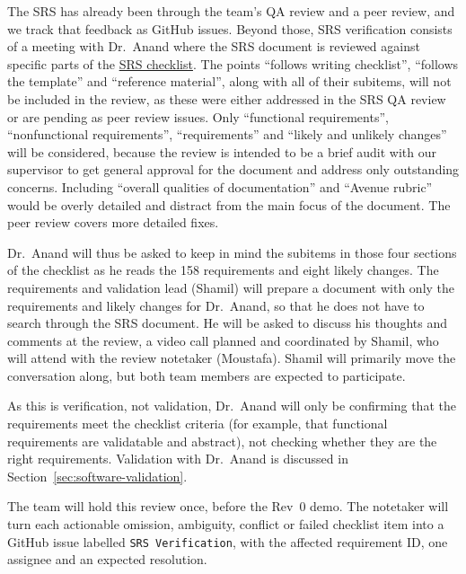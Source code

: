 \documentclass[12pt, titlepage]{article}
\begin{document}
The SRS has already been through the team's QA review and a peer review, and we
track that feedback as GitHub issues. Beyond those, SRS verification consists of
a meeting with Dr.\ Anand where the SRS document is reviewed against specific parts of the
\href{https://github.com/AHMEDELZARIA/squigglr/blob/main/docs/Checklists/SRS-Checklist.tex}{SRS
checklist}. The points ``follows writing checklist'', ``follows the template''
and ``reference material'', along with all of their subitems, will not be
included in the review, as these were either addressed in the SRS QA review or
are pending as peer review issues. Only ``functional requirements'',
``nonfunctional requirements'', ``requirements'' and ``likely and unlikely
changes'' will be considered, because the review is intended to be a brief audit
with our supervisor to get general approval for the document and address only
outstanding concerns. Including ``overall qualities of documentation'' and
``Avenue rubric'' would be overly detailed and distract from the main focus of
the document. The peer review covers more detailed fixes.

Dr.\ Anand will thus be asked to keep in mind the subitems in those four
sections of the checklist as he reads the 158 requirements and eight likely
changes. The requirements and validation lead (Shamil) will prepare a document
with only the requirements and likely changes for Dr.\ Anand, so that he does
not have to search through the SRS document. He will be asked to discuss his
thoughts and comments at the review, a video call planned and coordinated by
Shamil, who will attend with the review notetaker (Moustafa). Shamil will
primarily move the conversation along, but both team members are expected to
participate.

As this is verification, not validation, Dr.\ Anand will only be confirming
that the requirements meet the checklist criteria (for example, that functional
requirements are validatable and abstract), not checking whether they are the
right requirements. Validation with Dr.\ Anand is discussed in
Section~\ref{sec:software-validation}.

The team will hold this review once, before the Rev~0 demo. The notetaker will
turn each actionable omission, ambiguity, conflict or failed checklist item into
a GitHub issue labelled \texttt{SRS Verification}, with the affected requirement
ID, one assignee and an expected resolution.
\end{document}
